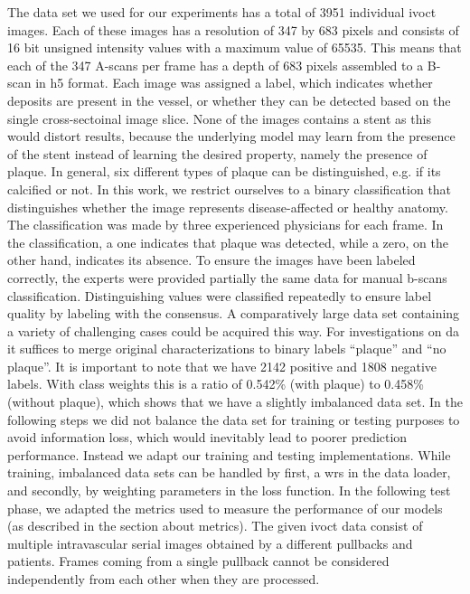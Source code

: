 The data set we used for our experiments has a total of 3951 individual \acrshort{ivoct} images. Each of these images has a resolution of 347 by 683 pixels and consists of 16 bit unsigned intensity values with a maximum value of 65535. This means that each of the 347 A-scans per frame has a depth of 683 pixels assembled to a B-scan in h5 format. Each image was assigned a label, which indicates whether deposits are present in the vessel, or whether they can be detected based on the single cross-sectoinal image slice. None of the images contains a stent as this would distort results, because the underlying model may learn from the presence of the stent instead of learning the desired property, namely the presence of plaque. In general, six different types of plaque can be distinguished, e.g. if its calcified or not. In this work, we restrict ourselves to a binary classification that distinguishes whether the image represents disease-affected or healthy anatomy. The classification was made by three experienced physicians for each frame. In the classification, a one indicates that plaque was detected, while a zero, on the other hand, indicates its absence. To ensure the images have been labeled correctly, the experts were provided partially the same data for manual \glspl{b-scan} classification. Distinguishing values were classified repeatedly to ensure label quality by labeling with the consensus. A comparatively large data set containing a variety of challenging cases could be acquired this way. For investigations on \acrshort{da} it suffices to merge original characterizations to binary labels “plaque” and “no plaque”. It is important to note that we have 2142 positive and 1808 negative labels. With class weights this is a ratio of 0.542\% (with plaque) to 0.458\% (without plaque), which shows that we have a slightly imbalanced data set. In the following steps we did not balance the data set for training or testing purposes to avoid information loss, which would inevitably lead to poorer prediction performance. Instead we adapt our training and testing implementations. While training, imbalanced data sets can be handled by first, a \gls{wrs} in the data loader, and secondly, by weighting parameters in the loss function. In the following test phase, we adapted the metrics used to measure the performance of our models (as described in the section about metrics). The given \acrshort{ivoct} data consist of multiple intravascular serial images obtained by a different pullbacks and patients. Frames coming from a single pullback cannot be considered independently from each other when they are processed.

